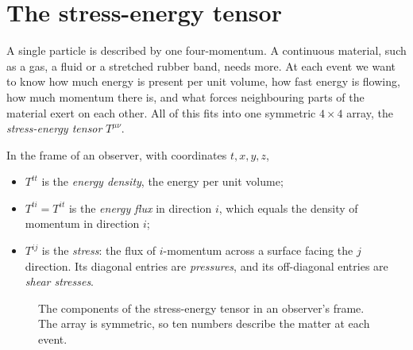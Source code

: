 \section{The stress-energy tensor}\label{sec:stress-energy}

A single particle is described by one four-momentum. A continuous material,
such as a gas, a fluid or a stretched rubber band, needs more. At each event
we want to know how much energy is present per unit volume, how fast energy is
flowing, how much momentum there is, and what forces neighbouring parts of the
material exert on each other. All of this fits into one symmetric $4\times4$
array, the \emph{stress-energy tensor} $T^{\mu\nu}$.

\begin{definition}
In the frame of an observer, with coordinates $t, x, y, z$,
\begin{itemize}
\item $T^{tt}$ is the \emph{energy density}, the energy per unit volume;
\item $T^{ti} = T^{it}$ is the \emph{energy flux} in direction $i$, which equals
  the density of momentum in direction $i$;
\item $T^{ij}$ is the \emph{stress}: the flux of $i$-momentum across a surface
  facing the $j$ direction. Its diagonal entries are \emph{pressures}, and its
  off-diagonal entries are \emph{shear stresses}.
\end{itemize}
\end{definition}

\begin{figure}[htbp]
\centering
{}
\caption{The components of the stress-energy tensor in an observer's frame. The
array is symmetric, so ten numbers describe the matter at each event.}
\label{fig:stress-energy}
\end{figure}

